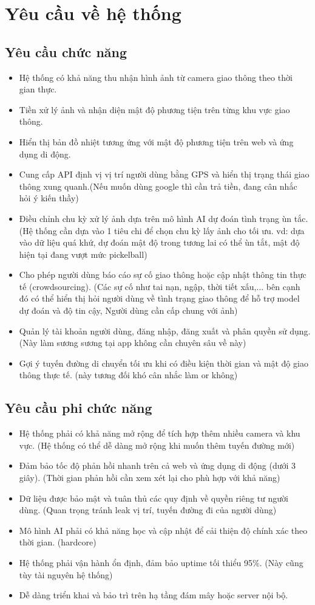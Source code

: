 \section{Yêu cầu về hệ thống}
\subsection{Yêu cầu chức năng}
\begin{itemize}
  \item Hệ thống có khả năng thu nhận hình ảnh từ camera giao thông theo thời gian thực.
  \item Tiền xử lý ảnh và nhận diện mật độ phương tiện trên từng khu vực giao thông.
  \item Hiển thị bản đồ nhiệt tương ứng với mật độ phương tiện trên web và ứng dụng di động.
  \item Cung cấp API định vị vị trí người dùng bằng GPS và hiển thị trạng thái giao thông xung quanh.(Nếu muốn dùng google thì cần trả tiền, đang cân nhắc hỏi ý kiến thầy)
  \item Điều chỉnh chu kỳ xử lý ảnh dựa trên mô hình AI dự đoán tình trạng ùn tắc. (Hệ thống cần dựa vào 1 tiêu chi để chọn chu kỳ lấy ảnh cho tối ưu. vd: dựa vào dữ liệu quá khứ, dự đoán mật độ trong tương lai có thể ùn tắt, mật độ hiện tại đang vượt mức pickelball)
  \item Cho phép người dùng báo cáo sự cố giao thông hoặc cập nhật thông tin thực tế (crowdsourcing). (Các sự cố như tai nạn, ngập, thời tiết xấu,... bên cạnh đó có thể hiển thị hỏi người dùng về tình trạng giao thông để hỗ trợ model dự đoán và độ tin cậy, Người dùng cần cấp chung với ảnh)
  \item Quản lý tài khoản người dùng, đăng nhập, đăng xuất và phân quyền sử dụng. (Này làm sương sương tại app không cần chuyên sâu về này)
  \item Gợi ý tuyến đường di chuyển tối ưu khi có điều kiện thời gian và mật độ giao thông thực tế. (này tương đối khó cân nhắc làm or không)
\end{itemize}
\subsection{Yêu cầu phi chức năng}
\begin{itemize}
  \item Hệ thống phải có khả năng mở rộng để tích hợp thêm nhiều camera và khu vực. (Hệ thống có thể dễ dàng mở rộng khi muốn thêm tuyến đường mới)
  \item Đảm bảo tốc độ phản hồi nhanh trên cả web và ứng dụng di động (dưới 3 giây). (Thời gian phản hồi cần xem xét lại cho phù hợp với khả năng)
  \item Dữ liệu được bảo mật và tuân thủ các quy định về quyền riêng tư người dùng. (Quan trọng tránh leak vị trí, tuyến đường đi của người dùng)
  \item Mô hình AI phải có khả năng học và cập nhật để cải thiện độ chính xác theo thời gian. (hardcore)
  \item Hệ thống phải vận hành ổn định, đảm bảo uptime tối thiểu 95\%. (Này cũng tùy tài nguyên hệ thống)
  \item Dễ dàng triển khai và bảo trì trên hạ tầng đám mây hoặc server nội bộ.
\end{itemize}
